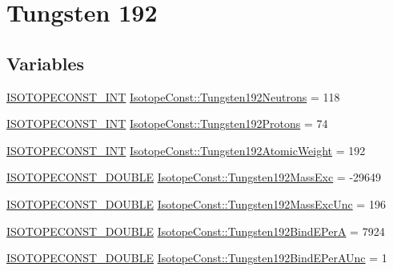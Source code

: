 \hypertarget{group___isotope_const-_tungsten-_w192}{}\section{Tungsten 192}
\label{group___isotope_const-_tungsten-_w192}
\subsection*{Variables}
\begin{DoxyCompactItemize}
\item 
\mbox{\hyperlink{group___isotope_const-_macros_ga5f18360b3e99483a35c32d789e62621c}{I\+S\+O\+T\+O\+P\+E\+C\+O\+N\+S\+T\+\_\+\+I\+NT}} \mbox{\hyperlink{group___isotope_const-_tungsten-_w192_gac4142d00867c27645ac32066b79fda33}{Isotope\+Const\+::\+Tungsten192\+Neutrons}} = 118
\item 
\mbox{\hyperlink{group___isotope_const-_macros_ga5f18360b3e99483a35c32d789e62621c}{I\+S\+O\+T\+O\+P\+E\+C\+O\+N\+S\+T\+\_\+\+I\+NT}} \mbox{\hyperlink{group___isotope_const-_tungsten-_w192_ga1cf2243a04d4a21adc771ee75d7c43d6}{Isotope\+Const\+::\+Tungsten192\+Protons}} = 74
\item 
\mbox{\hyperlink{group___isotope_const-_macros_ga5f18360b3e99483a35c32d789e62621c}{I\+S\+O\+T\+O\+P\+E\+C\+O\+N\+S\+T\+\_\+\+I\+NT}} \mbox{\hyperlink{group___isotope_const-_tungsten-_w192_gaad163033f4c7882dc3f116c7ee0eed69}{Isotope\+Const\+::\+Tungsten192\+Atomic\+Weight}} = 192
\item 
\mbox{\hyperlink{group___isotope_const-_macros_ga8f45a7272ce02c0b4c65c44636ed719a}{I\+S\+O\+T\+O\+P\+E\+C\+O\+N\+S\+T\+\_\+\+D\+O\+U\+B\+LE}} \mbox{\hyperlink{group___isotope_const-_tungsten-_w192_ga8fe66953568df277359139813ee75b11}{Isotope\+Const\+::\+Tungsten192\+Mass\+Exc}} = -\/29649
\item 
\mbox{\hyperlink{group___isotope_const-_macros_ga8f45a7272ce02c0b4c65c44636ed719a}{I\+S\+O\+T\+O\+P\+E\+C\+O\+N\+S\+T\+\_\+\+D\+O\+U\+B\+LE}} \mbox{\hyperlink{group___isotope_const-_tungsten-_w192_ga73d6c0feac66946d61d54b92c8633a74}{Isotope\+Const\+::\+Tungsten192\+Mass\+Exc\+Unc}} = 196
\item 
\mbox{\hyperlink{group___isotope_const-_macros_ga8f45a7272ce02c0b4c65c44636ed719a}{I\+S\+O\+T\+O\+P\+E\+C\+O\+N\+S\+T\+\_\+\+D\+O\+U\+B\+LE}} \mbox{\hyperlink{group___isotope_const-_tungsten-_w192_ga0bdde55f752d75da20fd69cf1fb620a5}{Isotope\+Const\+::\+Tungsten192\+Bind\+E\+PerA}} = 7924
\item 
\mbox{\hyperlink{group___isotope_const-_macros_ga8f45a7272ce02c0b4c65c44636ed719a}{I\+S\+O\+T\+O\+P\+E\+C\+O\+N\+S\+T\+\_\+\+D\+O\+U\+B\+LE}} \mbox{\hyperlink{group___isotope_const-_tungsten-_w192_ga36c540f66b237e6adad27826fefb8afe}{Isotope\+Const\+::\+Tungsten192\+Bind\+E\+Per\+A\+Unc}} = 1

\end{DoxyCompactItemize}

